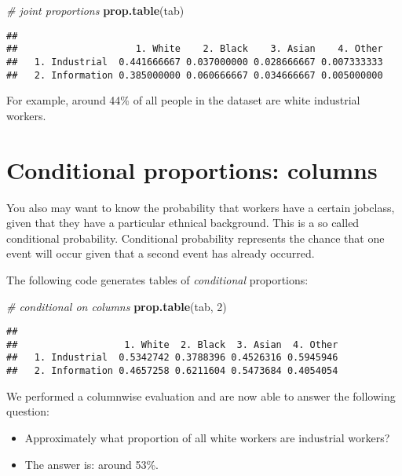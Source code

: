\documentclass[
]{book}
\newenvironment{Shaded}{\begin{snugshade}}{\end{snugshade}}
\newcommand{\CommentTok}[1]{\textcolor[rgb]{0.56,0.35,0.01}{\textit{#1}}}
\newcommand{\DecValTok}[1]{\textcolor[rgb]{0.00,0.00,0.81}{#1}}
\newcommand{\KeywordTok}[1]{\textcolor[rgb]{0.13,0.29,0.53}{\textbf{#1}}}
\newcommand{\NormalTok}[1]{#1}
\providecommand{\tightlist}{%
  \setlength{\itemsep}{0pt}\setlength{\parskip}{0pt}}
\begin{document}
\begin{Shaded}
\begin{Highlighting}[]
\CommentTok{\# joint proportions}
\KeywordTok{prop.table}\NormalTok{(tab) }
\end{Highlighting}
\end{Shaded}

\begin{verbatim}
##                 
##                     1. White    2. Black    3. Asian    4. Other
##   1. Industrial  0.441666667 0.037000000 0.028666667 0.007333333
##   2. Information 0.385000000 0.060666667 0.034666667 0.005000000
\end{verbatim}

For example, around 44\% of all people in the dataset are white industrial workers.

\hypertarget{conditional-proportions-columns}{%
\section{Conditional proportions: columns}\label{conditional-proportions-columns}}

You also may want to know the probability that workers have a certain jobclass, given that they have a particular ethnical background. This is a so called conditional probability. Conditional probability represents the chance that one event will occur given that a second event has already occurred.

The following code generates tables of \emph{conditional} proportions:

\begin{Shaded}
\begin{Highlighting}[]
\CommentTok{\# conditional on columns}
\KeywordTok{prop.table}\NormalTok{(tab, }\DecValTok{2}\NormalTok{)  }
\end{Highlighting}
\end{Shaded}

\begin{verbatim}
##                 
##                   1. White  2. Black  3. Asian  4. Other
##   1. Industrial  0.5342742 0.3788396 0.4526316 0.5945946
##   2. Information 0.4657258 0.6211604 0.5473684 0.4054054
\end{verbatim}

We performed a columnwise evaluation and are now able to answer the following question:

\begin{itemize}
\tightlist
\item
  Approximately what proportion of all white workers are industrial workers?
\item
  The answer is: around 53\%.
\end{itemize}
\end{document}
